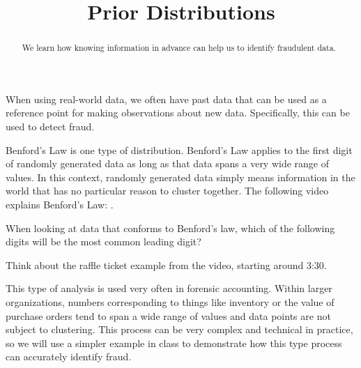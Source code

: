\documentclass{ximera}
\title{Prior Distributions}
\begin{document}
\begin{abstract}
We learn how knowing information in advance can help us to identify fraudulent data.
\end{abstract}
\maketitle

When using real-world data, we often have past data that can be used as a reference point for making observations about new data. Specifically, this can be used to detect fraud.

Benford's Law is one type of distribution. Benford's Law applies to the first digit of randomly generated data as long as that data spans a very wide range of values. In this context, randomly generated data simply means information in the world that has no particular reason to cluster together. The following video explains Benford's Law: .

\begin{question}
When looking at data that conforms to Benford's law, which of the following digits will be the most common leading digit?
  \begin{solution}
    \begin{multiple-choice}
    \end{multiple-choice}
    \begin{hint}
      Think about the raffle ticket example from the video, starting around 3:30.
    \end{hint}
  \end{solution}
\end{question}

This type of analysis is used very often in forensic accounting. Within larger organizations, numbers corresponding to things like inventory or the value of purchase orders tend to span a wide range of values and data points are not subject to clustering. This process can be very complex and technical in practice, so we will use a simpler example in class to demonstrate how this type process can accurately identify fraud.
\end{document}
